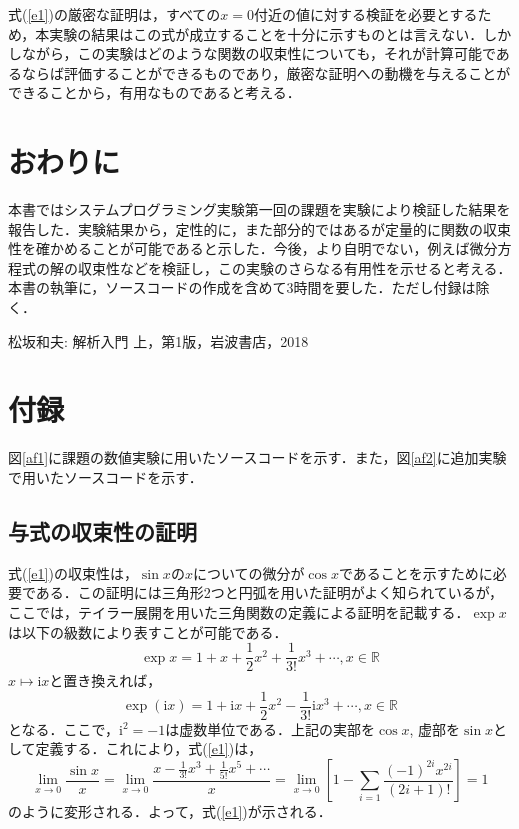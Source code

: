\documentclass[fleqn, a4paper. 12pt]{ltjsarticle} %
\begin{document}
    式(\ref{e1})の厳密な証明は，すべての$x=0$付近の値に対する検証を必要とするため\cite{Calculus}，本実験の結果はこの式が成立することを十分に示すものとは言えない．しかしながら，この実験はどのような関数の収束性についても，それが計算可能であるならば評価することができるものであり，厳密な証明への動機を与えることができることから，有用なものであると考える．
    \section{おわりに}
    本書ではシステムプログラミング実験第一回の課題を実験により検証した結果を報告した．実験結果から，定性的に，また部分的ではあるが定量的に関数の収束性を確かめることが可能であると示した．今後，より自明でない，例えば微分方程式の解の収束性などを検証し，この実験のさらなる有用性を示せると考える．本書の執筆に，ソースコードの作成を含めて3時間を要した．ただし付録は除く．

\begin{thebibliography}{00}
     松坂和夫: 解析入門 上，第1版，岩波書店，2018
    \end{thebibliography}
    \section{付録}
図\ref{af1}に課題の数値実験に用いたソースコードを示す．また，図\ref{af2}に追加実験で用いたソースコードを示す．
\subsection{与式の収束性の証明}
式(\ref{e1})の収束性は，$\sin x$の$x$についての微分が$\cos x$であることを示すために必要である．この証明には三角形2つと円弧を用いた証明がよく知られているが，ここでは，テイラー展開を用いた三角関数の定義による証明を記載する．$\exp x$は以下の級数により表すことが可能である．
\[
    \exp x = 1 + x + \frac{1}{2} x^2 + \frac{1}{3!}x^3 + \cdots, x\in \mathbb{R}
\]
\newcommand{\ci}{\mathrm{i}}
\newcommand{\cpi}{\mathrm{\pi}}
$x\mapsto\ci x$と置き換えれば，
\[
    \exp (\ci x) = 1 + \ci x + \frac{1}{2} x^2 - \frac{1}{3!}\ci x^3 + \cdots, x\in \mathbb{R}
\]
となる．ここで，$\ci^2=-1$は虚数単位である．上記の実部を$\cos x$, 虚部を$\sin x$として定義する．これにより，式(\ref{e1})は，
\[
    \lim_{x\to 0}\frac{\sin x}{x} = \lim_{x\to 0}\frac{x  - \frac{1}{3!}x^3 + \frac{1}{5!}x^5 + \cdots }{x} = \lim_{x\to 0} \left [1 - \sum_{i=1}\frac{(-1)^{2i}x^{2i}}{(2i+1)!}  \right]= 1
\]
のように変形される．よって，式(\ref{e1})が示される．
\end{document}
